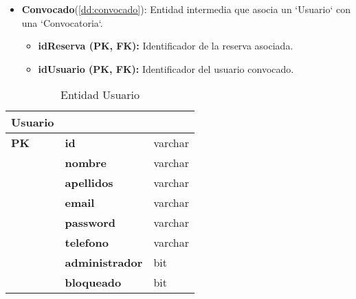 \begin{itemize}
	\item \textbf{Convocado}(\ref{dd:convocado}): Entidad intermedia que asocia un `Usuario` con una `Convocatoria`.
	\begin{itemize}
       \item \textbf{idReserva (PK, FK):} Identificador de la reserva asociada.
       \item \textbf{idUsuario (PK, FK):} Identificador del usuario convocado.
	\end{itemize}
\end{itemize}

\begin{table}[H]
	\centering
	\begin{tabularx}{\linewidth}{ p{} p{} p{} }
		\toprule
		\textbf{Usuario} &                  & \\
		\toprule
		\textbf{PK}      & \textbf{id}              & varchar \\
		\toprule
                         & \textbf{nombre}          & varchar \\
                         & \textbf{apellidos}       & varchar \\
                         & \textbf{email}           & varchar \\
                         & \textbf{password}        & varchar \\
                         & \textbf{telefono}        & varchar \\
                         & \textbf{administrador}   & bit \\
                         & \textbf{bloqueado}       & bit \\
		\bottomrule
	\end{tabularx}
	\caption{Entidad Usuario}
	\label{dd:usuario}
\end{table}

